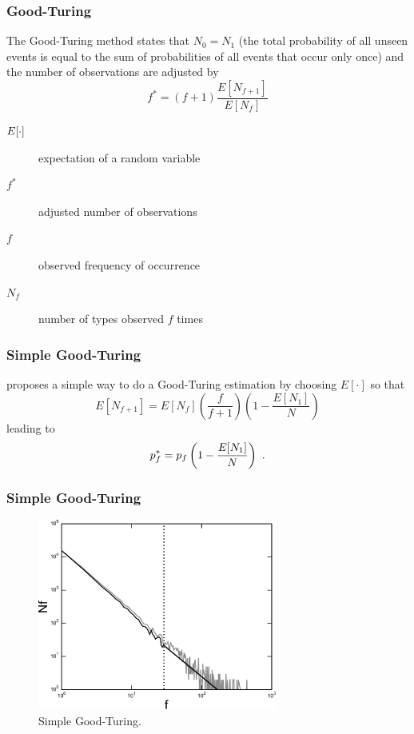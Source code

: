 \documentclass{beamer}
\begin{document}
\frame
{
  \frametitle{Good-Turing}
  The Good-Turing method states that
  $N_0 = N_1$ (the total probability of all unseen events is 
  equal to the sum of probabilities of all events that occur only once) and
  the number of observations are adjusted by
  \begin{equation}
  \label{eq:goodturingnormnum}
  f^\ast = (f + 1) \frac{E[N_{f+1}]}{E[N_f]}
  \end{equation}
  
  \begin{description}
  \item[$E\symbol{91} \cdot \symbol{93}$] expectation of a random variable
  \item[$f^\ast$] adjusted number of observations
  \item[$f$] observed frequency of occurrence 
  \item[$N_f$] number of types observed $f$ times
  \end{description}
}


\frame
{
  \frametitle{Simple Good-Turing}
  \cite{galesampson95} proposes a simple way to do a Good-Turing estimation by choosing $E[\cdot]$ so that
  \begin{equation}
  \label{eq:goodturingestimator}
  E[N_{f+1}] = E[N_f] \left( \frac{f}{f+1} \right) \left( 1 - \frac{E[N_1]}{N} \right)
  \end{equation}
  leading to
  \begin{equation}
  p^\ast_f = p_f \left( 1 - \frac{E[N_1]}{N} \right) \textmd{ .}
  \end{equation} 
}

\frame
{
  \frametitle{Simple Good-Turing}

  \begin{figure}[h!]
  \centering
  \includegraphics[width=0.70\textwidth]{images/inverse_zipf_sgt.pdf}
  \caption{Simple Good-Turing.}
  \label{fig:inverse_zipf_sgt}
  \end{figure}
}
\end{document}
